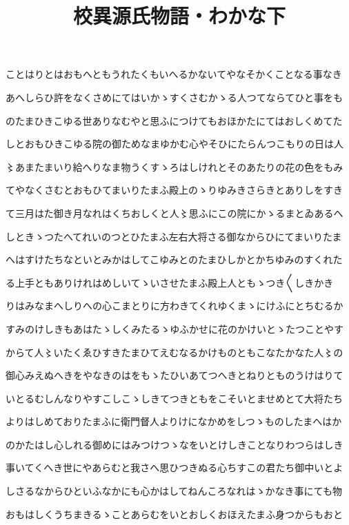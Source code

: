 \documentclass[a4paper,11pt,landscape]{ltjtarticle}
\title{校異源氏物語・わかな下}
\date{}
\begin{document}
\maketitle

ことはりとはおもへともうれたくもいへるかないてやなそかくことなる事なき
\par\medskip
あへしらひ許をなくさめにてはいかゝすくさむかゝる人つてならてひと事をも
\par\medskip
のたまひきこゆる世ありなむやと思ふにつけてもおほかたにてはおしくめてた
\par\medskip
しとおもひきこゆる院の御ためなまゆかむ心やそひにたらんつこもりの日は人
\par\medskip
〻あまたまいり給へりなま物うくすゝろはしけれとそのあたりの花の色をもみ
\par\medskip
てやなくさむとおもひてまいりたまふ殿上のゝりゆみきさらきとありしをすき
\par\medskip
て三月はた御き月なれはくちおしくと人〻思ふにこの院にかゝるまとゐあるへ
\par\medskip
しときゝつたへてれいのつとひたまふ左右大将さる御なからひにてまいりたま
\par\medskip
へはすけたちなといとみかはしてこゆみとのたまひしかとかちゆみのすくれた
\par\medskip
る上手ともありけれはめしいてゝいさせたまふ殿上人ともゝつき〱しきかき
\par\medskip
りはみなまへしりへの心こまとりに方わきてくれゆくまゝにけふにとちむるか
\par\medskip
すみのけしきもあはたゝしくみたるゝゆふかせに花のかけいとゝたつことやす
\par\medskip
からて人〻いたくゑひすきたまひてえむなるかけものともこなたかなた人〻の
\par\medskip
御心みえぬへきをやなきのはをもゝたひいあてつへきとねりとものうけはりて
\par\medskip
いとるむしんなりやすこしこゝしきてつきともをこそいとませめとて大将たち
\par\medskip
よりはしめておりたまふに衛門督人よりけになかめをしつゝものしたまへはか
\par\medskip
のかたはし心しれる御めにはみつけつゝなをいとけしきことなりわつらはしき
\par\medskip
事いてくへき世にやあらむと我さへ思ひつきぬる心ちすこの君たち御中いとよ
\par\medskip
しさるなからひといふなかにも心かはしてねんころなれはゝかなき事にても物
\par\medskip
おもはしくうちまきるゝことあらむをいとおしくおほえたまふ身つからもおと
\end{document}
